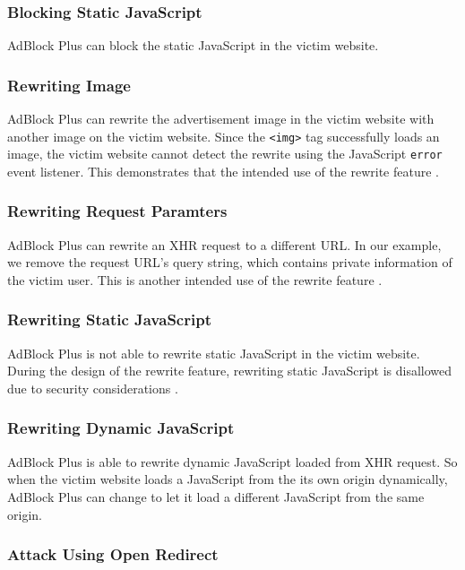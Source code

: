 \documentclass[conference]{IEEEtran}
\begin{document}
\subsubsection{Blocking Static JavaScript}

AdBlock Plus can block the static JavaScript in the victim website.

\subsubsection{Rewriting Image}

AdBlock Plus can rewrite the advertisement image in the victim website with another image on the victim website. Since the \lstinline{<img>} tag successfully loads an image, the victim website cannot detect the rewrite using the JavaScript \lstinline{error} event listener. This demonstrates that the intended use of the rewrite feature \cite{abp_filter_guide}.

\subsubsection{Rewriting Request Paramters}

AdBlock Plus can rewrite an XHR request to a different URL. In our example, we remove the request URL's query string, which contains private information of the victim user. This is another intended use of the rewrite feature \cite{abp_issue_6622}.

\subsubsection{Rewriting Static JavaScript}

AdBlock Plus is not able to rewrite static JavaScript in the victim website. During the design of the rewrite feature, rewriting static JavaScript is disallowed due to security considerations \cite{abp_issue_6622}.

\subsubsection{Rewriting Dynamic JavaScript}

AdBlock Plus is able to rewrite dynamic JavaScript loaded from XHR request. So when the victim website loads a JavaScript from the its own origin dynamically, AdBlock Plus can change to let it load a different JavaScript from the same origin.

\subsubsection{Attack Using Open Redirect}
\end{document}
